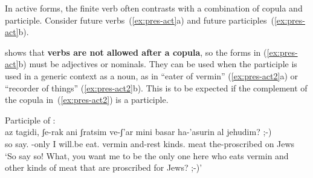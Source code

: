 \begin{exe}
\begin{xlist}
\begin{exe}
\begin{xlist}
\begin{exe}
\begin{exe}
\begin{xlist}
\begin{exe}
\begin{exe}
\begin{xlist}
\begin{exe}
\begin{xlist}
\begin{exe}
\begin{xlist}
\begin{exe}
\begin{xlist}
\begin{xlist}
\begin{exe}
\begin{xlist}
\begin{exe}
\begin{xlist}
\begin{exe}
\begin{exe}
\begin{exe}
\begin{xlist}
\begin{exe}
\begin{exe}
\begin{xlist}
In active forms, the finite verb often contrasts with a combination of copula and participle. Consider future verbs~(\ref{ex:pres-act}a) and future participles~(\ref{ex:pres-act}b).
 \begin{exe}
 \ex  \label{ex:pres-act} 
 \begin{xlist} 
 
 
 \z
\z 
\cite{doron00} shows that \textbf{verbs are not allowed after a copula}, so the forms in (\ref{ex:pres-act}b) must be adjectives or nominals. They can be used when the participle is used in a generic context as a noun, as in ``eater of vermin'' (\ref{ex:pres-act2}a) or ``recorder of things'' (\ref{ex:pres-act2}b). This is to be expected if the complement of the copula in~(\ref{ex:pres-act2}) is a participle.
 \begin{exe}
 \ex  \label{ex:pres-act2} 
 \begin{xlist} 
  \ex  Participle of {\tkal}: \\
	{ \gll az tagidi, ʃe-rak ani   ʃratsim ve-ʃ'ar mini basar ha-'asurin al jehudim? ;-)\\
        so say. -only I will.be eat. vermin and-rest kinds. meat the-proscribed on Jews\\
      \glt `So say so! What, you want me to be the only one here who eats vermin and other kinds of meat that are proscribed for Jews? ;-)'\footnotemark } 
 

\end{xlist}
\end{exe}
\end{xlist}
\end{exe}
\end{xlist}
\end{exe}
\end{exe}
\end{xlist}
\end{exe}
\end{exe}
\end{exe}
\end{xlist}
\end{exe}
\end{xlist}
\end{exe}
\end{xlist}
\end{xlist}
\end{exe}
\end{xlist}
\end{exe}
\end{xlist}
\end{exe}
\end{xlist}
\end{exe}
\end{exe}
\end{xlist}
\end{exe}
\end{exe}
\end{xlist}
\end{exe}
\end{xlist}
\end{exe}
